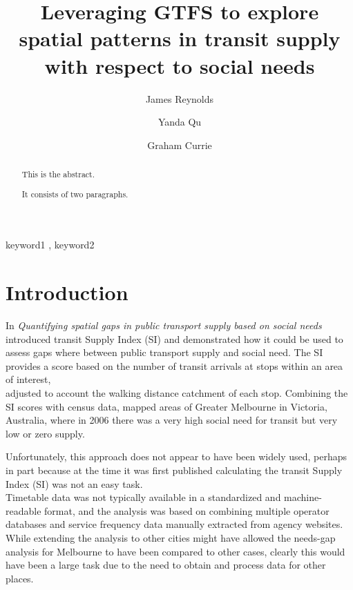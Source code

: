 \documentclass[preprint, 3p,
authoryear]{elsarticle} %
\begin{document}
\begin{frontmatter}

  \title{Leveraging GTFS to explore spatial patterns in transit supply
with respect to social needs}
    \author[Public Transport Research Group (PTRG)]{James Reynolds%
  }
    \author[Public Transport Research Group (PTRG)]{Yanda Qu%
  }
    \author[Public Transport Research Group (PTRG)]{Graham Currie%
  }
  
  \begin{abstract}
  This is the abstract.

  It consists of two paragraphs.
  \end{abstract}
    \begin{keyword}
    keyword1 \sep 
    keyword2
  \end{keyword}
  
 \end{frontmatter}

\hypertarget{introduction}{%
\section{Introduction}\label{introduction}}

In \emph{Quantifying spatial gaps in public transport supply based on
social needs} \citet{currie2010identifying} introduced transit Supply
Index (SI) and demonstrated how it could be used to assess gaps where
between public transport supply and social need. The SI provides a score
based on the number of transit arrivals at stops within an area of
interest,\\
adjusted to account the walking distance catchment of each stop.
Combining the SI scores with census data, \citet{currie2010identifying}
mapped areas of Greater Melbourne in Victoria, Australia, where in 2006
there was a very high social need for transit but very low or zero
supply.

Unfortunately, this approach does not appear to have been widely used,
perhaps in part because at the time it was first published calculating
the transit Supply Index (SI) was not an easy task.\\
Timetable data was not typically available in a standardized and
machine-readable format, and the \citet{currie2010identifying} analysis
was based on combining multiple operator databases and service frequency
data manually extracted from agency websites. While extending the
analysis to other cities might have allowed the needs-gap analysis for
Melbourne to have been compared to other cases, clearly this would have
been a large task due to the need to obtain and process data for other
places.
\end{document}
